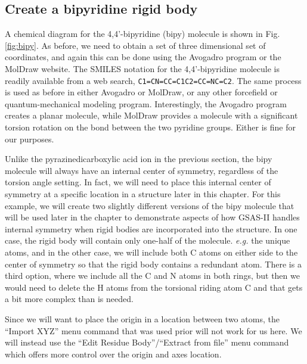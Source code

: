 \subsection{Create a bipyridine rigid body}
A chemical diagram for the 4,4'-bipyridine (bipy) molecule is shown in Fig. \ref{fig:bipy}. As before, we need to obtain a set of three dimensional set of coordinates, and again this can be done using the Avogadro program or the MolDraw website. The SMILES notation for the 4,4'-bipyridine molecule is readily available from a web search, \mbox{\texttt{C1=CN=CC=C1C2=CC=NC=C2}}. The same process is used as before in either Avogadro or MolDraw, or any other forcefield or quantum-mechanical modeling program. Interestingly, the Avogadro program creates a planar molecule, while MolDraw provides a molecule with a significant torsion rotation on the bond between the two pyridine groups. Either is fine for our purposes. 

Unlike the pyrazinedicarboxylic acid ion in the previous section, the bipy molecule will always have an internal center of symmetry, regardless of the torsion angle setting. In fact, we will need to place this internal center of symmetry at a specific location in a structure later in this chapter. For this example, we will create two slightly different versions of the bipy molecule that will be used later in the chapter to demonstrate aspects of how GSAS-II handles internal symmetry when rigid bodies are incorporated into the structure. In one case, the rigid body will contain only one-half of the molecule. \textit{e.g.} the unique atoms, and in the other case, we will include both C atoms on either side to the center of symmetry so that the rigid body contains a redundant atom. There is a third option, where we include all the C and N atoms in both rings, but then we would need to delete the H atoms from the torsional riding atom C and that gets a bit more complex than is needed. 

Since we will want to place the origin in a location between two atoms, the ``Import XYZ'' menu command that was used prior will not work for us here. We will instead use the ``Edit Residue Body''/``Extract from file'' menu command which offers more control over the origin and axes location. 

